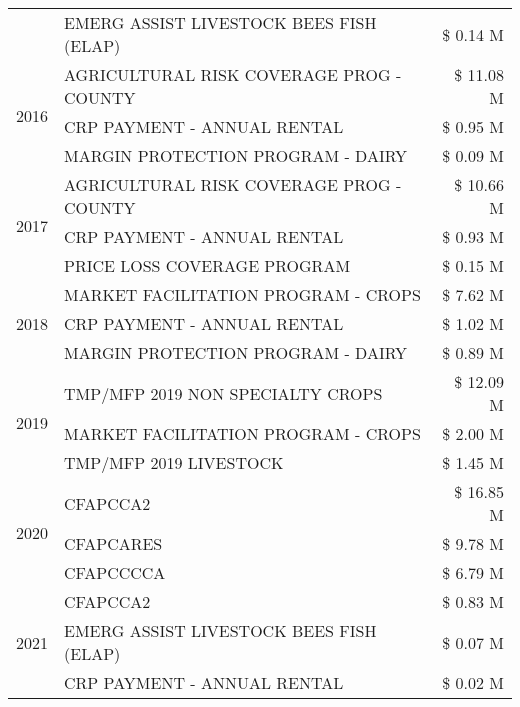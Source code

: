 \begin{tabular}{llr}
 & EMERG ASSIST LIVESTOCK BEES FISH (ELAP) & \$ 0.14 M \\
\cline{1-3}
\multirow[t]{3}{*}{2016} & AGRICULTURAL RISK COVERAGE PROG - COUNTY & \$ 11.08 M \\
 & CRP PAYMENT - ANNUAL RENTAL & \$ 0.95 M \\
 & MARGIN PROTECTION PROGRAM - DAIRY & \$ 0.09 M \\
\cline{1-3}
\multirow[t]{3}{*}{2017} & AGRICULTURAL RISK COVERAGE PROG - COUNTY & \$ 10.66 M \\
 & CRP PAYMENT - ANNUAL RENTAL & \$ 0.93 M \\
 & PRICE LOSS COVERAGE PROGRAM & \$ 0.15 M \\
\cline{1-3}
\multirow[t]{3}{*}{2018} & MARKET FACILITATION PROGRAM - CROPS & \$ 7.62 M \\
 & CRP PAYMENT - ANNUAL RENTAL & \$ 1.02 M \\
 & MARGIN PROTECTION PROGRAM - DAIRY & \$ 0.89 M \\
\cline{1-3}
\multirow[t]{3}{*}{2019} & TMP/MFP 2019 NON SPECIALTY CROPS & \$ 12.09 M \\
 & MARKET FACILITATION PROGRAM - CROPS & \$ 2.00 M \\
 & TMP/MFP 2019 LIVESTOCK & \$ 1.45 M \\
\cline{1-3}
\multirow[t]{3}{*}{2020} & CFAPCCA2 & \$ 16.85 M \\
 & CFAPCARES & \$ 9.78 M \\
 & CFAPCCCCA & \$ 6.79 M \\
\cline{1-3}
\multirow[t]{3}{*}{2021} & CFAPCCA2 & \$ 0.83 M \\
 & EMERG ASSIST LIVESTOCK BEES FISH (ELAP) & \$ 0.07 M \\
 & CRP PAYMENT - ANNUAL RENTAL & \$ 0.02 M \\
\cline{1-3}
\bottomrule
\end{tabular}
